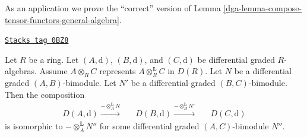 As an application we prove the ``correct'' version of
Lemma \ref{dga-lemma-compose-tensor-functors-general-algebra}.

\begin{lemma}
\label{dga-lemma-compose-tensor-functors-tor}
\href{https://stacks.math.columbia.edu/tag/0BZ8}{\texttt{Stacks tag 0BZ8}}

Let $R$ be a ring. Let $(A, \text{d})$, $(B, \text{d})$, and
$(C, \text{d})$ be differential graded $R$-algebras. Assume
$A \otimes_R C$ represents $A \otimes^\mathbf{L}_R C$ in $D(R)$.
Let $N$ be a differential graded $(A, B)$-bimodule.
Let $N'$ be a differential graded $(B, C)$-bimodule.
Then the composition
$$
\begin{array}{ccccc}D(A, \text{d}) \overset{- \otimes_A^\mathbf{L} N}{\longrightarrow} &  & D(B, \text{d}) \overset{- \otimes_B^\mathbf{L} N'}{\longrightarrow} &  & D(C, \text{d})\end{array}
$$
is isomorphic to $- \otimes_A^\mathbf{L} N''$ for some differential graded
$(A, C)$-bimodule $N''$.
\end{lemma}


